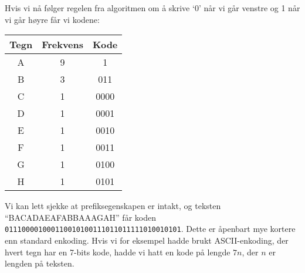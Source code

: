 \begin{eks}
			Hvis vi nå følger regelen fra algoritmen om å skrive `0' når vi går venstre og 1 når vi går høyre får vi kodene:
			\begin{center}
				\begin{tabular}{c c c}
					Tegn & Frekvens & Kode \\
					\hline
					A & 9 & 1\\
					B & 3 & 011\\
					C & 1 & 0000\\
					D & 1 & 0001\\
					E & 1 & 0010\\
					F & 1 & 0011\\
					G & 1 & 0100\\
					H & 1 & 0101
				\end{tabular}
			\end{center}
			Vi kan lett sjekke at prefiksegenskapen er intakt, og teksten ``BACADAEAFABBAAAGAH'' får koden \verb|011100001000110010100111011011111010010101|. Dette er åpenbart mye kortere enn standard enkoding. Hvis vi for eksempel hadde brukt ASCII-enkoding, der hvert tegn har en 7-bits kode, hadde vi hatt en kode på lengde $7n$, der $n$ er lengden på teksten.
			\end{eks}